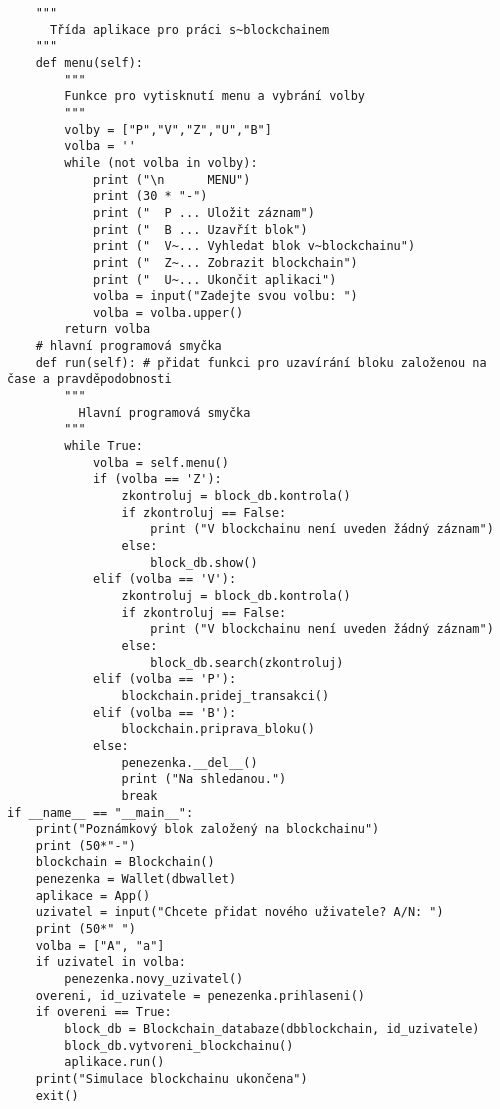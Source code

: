 \documentclass[12pt]{report}			%
\begin{document}
{\begin{appendices}
\begin{lstlisting}
    """
      Třída aplikace pro práci s~blockchainem
    """
    def menu(self):
        """
        Funkce pro vytisknutí menu a vybrání volby
        """
        volby = ["P","V","Z","U","B"]
        volba = ''
        while (not volba in volby):
            print ("\n      MENU")
            print (30 * "-")
            print ("  P ... Uložit záznam")
            print ("  B ... Uzavřít blok")
            print ("  V~... Vyhledat blok v~blockchainu")
            print ("  Z~... Zobrazit blockchain")
            print ("  U~... Ukončit aplikaci")
            volba = input("Zadejte svou volbu: ")
            volba = volba.upper()
        return volba 
    # hlavní programová smyčka
    def run(self): # přidat funkci pro uzavírání bloku založenou na čase a pravděpodobnosti
        """
          Hlavní programová smyčka
        """
        while True:
            volba = self.menu()
            if (volba == 'Z'):
                zkontroluj = block_db.kontrola()
                if zkontroluj == False:
                    print ("V blockchainu není uveden žádný záznam")
                else:
                    block_db.show()
            elif (volba == 'V'):
                zkontroluj = block_db.kontrola()
                if zkontroluj == False:
                    print ("V blockchainu není uveden žádný záznam")
                else:
                    block_db.search(zkontroluj)
            elif (volba == 'P'):
                blockchain.pridej_transakci()
            elif (volba == 'B'):
                blockchain.priprava_bloku()
            else:
                penezenka.__del__()
                print ("Na shledanou.")
                break
if __name__ == "__main__":
    print("Poznámkový blok založený na blockchainu")
    print (50*"-")
    blockchain = Blockchain()
    penezenka = Wallet(dbwallet)
    aplikace = App()
    uzivatel = input("Chcete přidat nového uživatele? A/N: ")
    print (50*" ")
    volba = ["A", "a"]
    if uzivatel in volba:
        penezenka.novy_uzivatel()
    overeni, id_uzivatele = penezenka.prihlaseni()
    if overeni == True:
        block_db = Blockchain_databaze(dbblockchain, id_uzivatele)
        block_db.vytvoreni_blockchainu()
        aplikace.run()
    print("Simulace blockchainu ukončena")
    exit()
	\end{lstlisting}	

\end{appendices}}
\end{document}
